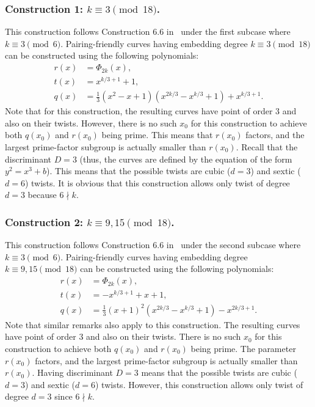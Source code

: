 \subsubsection{Construction 1: $k \equiv 3 \pmod{18}$.}
\label{con1}
This construction follows {Construction 6.6} in~\cite{2010/freeman}
under the first subcase where $k \equiv 3 \pmod{6}$.
Pairing-friendly curves having embedding degree $k \equiv 3 \pmod{18}$
can be constructed using the following polynomials:
\begin{align*}
r(x) &= \Phi_{2k}(x),	\\
t(x) &= x^{k/3+1} + 1,	\\
q(x) &= \frac{1}{3} (x^2 - x + 1) (x^{2k/3} - x^{k/3} + 1) + x^{k/3+1}.
\end{align*}
Note that for this construction,
the resulting curves have point of order 3 and also on their twists.
However, there is no such $x_0$ for this construction to achieve
both $q(x_0)$ and $r(x_0)$ being prime.
This means that $r(x_0)$ factors, and the largest prime-factor subgroup is actually smaller than $r(x_0)$.
Recall that the discriminant $D = 3$ (thus, the curves are defined by the equation of the form $y^2 = x^3 + b$).
This means that the possible twists are  cubic ($d=3$) and sextic ($d=6$) twists.
It is obvious that this construction allows only twist of degree $d = 3$ because $6 \nmid k$.



\subsubsection{Construction 2: $k \equiv 9,15 \pmod{18}$.}
\label{con2}
This construction follows {Construction 6.6} in~\cite{2010/freeman}
under the second subcase where $k \equiv 3 \pmod{6}$.
Pairing-friendly curves having embedding degree $k \equiv 9,15 \pmod{18}$
can be constructed using the following polynomials:
\begin{align*}
r(x) &= \Phi_{2k}(x),	\\
t(x) &= -x^{k/3+1} + x + 1,	\\
q(x) &= \frac{1}{3} (x+1)^2 (x^{2k/3} - x^{k/3} + 1) - x^{2k/3+1}.
\end{align*}
Note that similar remarks also apply to this construction.
The resulting curves have point of order 3 and also on their twists.
There is no such $x_0$ for this construction to achieve both $q(x_0)$ and $r(x_0)$ being prime.
The parameter  $r(x_0)$ factors, and the largest prime-factor subgroup is actually smaller than $r(x_0)$.
Having discriminant $D = 3$
means that the possible twists are  cubic ($d=3$) and sextic ($d=6$) twists.
However, this construction allows only twist of degree $d = 3$ since $6 \nmid k$.


